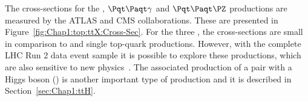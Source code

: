 \begin{comment}
\begin{figure}
        \begin{subfigure}[b]{0.25\textwidth}
                \texttt{[image: Chapter1/ttW\_qq\_A]}
                \caption{}
        \end{subfigure}%
        \begin{subfigure}[b]{0.25\textwidth}
                \texttt{[image: Chapter1/ttW\_qq\_B]}
                \caption{}
        \end{subfigure}%
        \begin{subfigure}[b]{0.25\textwidth}
                \texttt{[image: Chapter1/ttW\_gq\_A]}
                \caption{}
        \end{subfigure}%
        \begin{subfigure}[b]{0.25\textwidth}
                \texttt{[image: Chapter1/ttW\_gq\_B]}
                \caption{}
        \end{subfigure}
        \caption{Representative Feynman diagrams for \ttW production.
        Left diagrams show the $\bar{q}q'\rightarrow \ttW$ processes 
        and right ones the $\bar{q}g\rightarrow \ttW q'$ production. \pablo{igual tampoco
        	hace falta enseñar estos diagramas}}\label{fig:Chap1:top:ttX:ttW_Feynman}
\end{figure}
\end{comment}

The cross-sections for the \ttW, $\ttbar \gamma$ and $\ttbar \PZ$ productions 
are measured by the ATLAS and CMS collaborations. %
These are presented in 
Figure~\ref{fig:Chap1:top:ttX:Cross-Sec}. For the three \ttX, the cross-sections
are small in comparison to \ttbar and single top-quark productions.
However, with the complete LHC Run 2 data event sample it is possible to explore these productions, which
are also sensitive to new physics~\cite{ATLAS:2020hpj}. 
The associated production of a \ttbar pair with a Higgs boson (\ttH) is another important
type of \ttX production and it is described in Section~\ref{sec:Chap1:ttH}.

